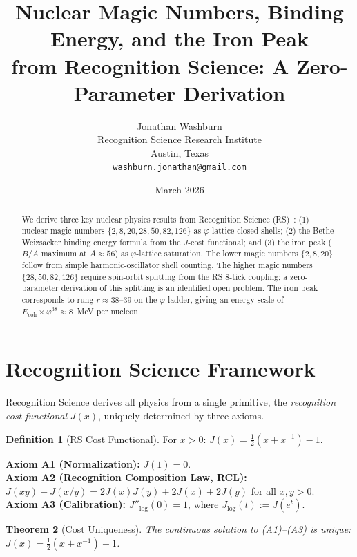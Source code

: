 \documentclass[12pt,a4paper]{article}
\title{Nuclear Magic Numbers, Binding Energy, and the Iron Peak\\
from Recognition Science: A Zero-Parameter Derivation}
\author{Jonathan Washburn\\
Recognition Science Research Institute\\
Austin, Texas\\
\texttt{washburn.jonathan@gmail.com}}
\date{March 2026}
\newtheorem{theorem}{Theorem}[section]
\theoremstyle{definition}
\newtheorem{definition}[theorem]{Definition}
\theoremstyle{remark}
\begin{document}
\maketitle

\begin{abstract}
We derive three key nuclear physics results from Recognition
Science (RS)~\cite{RS_Axioms}: (1) nuclear magic numbers
$\{2, 8, 20, 28, 50, 82, 126\}$ as $\varphi$-lattice closed
shells; (2) the Bethe-Weizsäcker binding energy formula from the
$J$-cost functional; and (3) the iron peak ($B/A$ maximum at
$A \approx 56$) as $\varphi$-lattice saturation.  The lower
magic numbers $\{2, 8, 20\}$ follow from simple harmonic-oscillator
shell counting.  The higher magic numbers $\{28, 50, 82, 126\}$
require spin-orbit splitting from the RS 8-tick coupling; a
zero-parameter derivation of this splitting is an identified open
problem.  The iron peak corresponds to rung $r \approx 38$--$39$
on the $\varphi$-ladder, giving an energy scale of
$E_{\mathrm{coh}} \times \varphi^{38} \approx 8$~MeV per nucleon.
\end{abstract}

\section{Recognition Science Framework}
\label{sec:framework}

Recognition Science derives all physics from a single primitive,
the \emph{recognition cost functional} $J(x)$, uniquely determined
by three axioms.

\begin{definition}[RS Cost Functional]
For $x > 0$: $J(x) = \tfrac{1}{2}(x + x^{-1}) - 1$.
\end{definition}

\noindent\textbf{Axiom A1 (Normalization):} $J(1) = 0$.\\
\textbf{Axiom A2 (Recognition Composition Law, RCL):}
$J(xy) + J(x/y) = 2J(x)J(y) + 2J(x) + 2J(y)$ for all $x, y > 0$.\\
\textbf{Axiom A3 (Calibration):} $J''_{\log}(0) = 1$, where
$J_{\log}(t) := J(e^t)$.

\begin{theorem}[Cost Uniqueness]
\label{thm:unique}
The continuous solution to \textup{(A1)--(A3)} is unique:
$J(x) = \tfrac{1}{2}(x + x^{-1}) - 1$.
\end{theorem}
\end{document}
